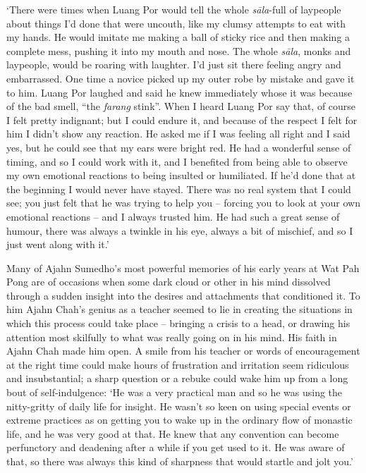 `There were times when Luang Por would tell the whole \emph{sāla}-full
of laypeople about things I'd done that were uncouth, like my clumsy
attempts to eat with my hands. He would imitate me making a ball of
sticky rice and then making a complete mess, pushing it into my mouth
and nose. The whole \emph{sāla}, monks and laypeople, would be roaring
with laughter. I'd just sit there feeling angry and embarrassed. One
time a novice picked up my outer robe by mistake and gave it to him. 
Luang Por laughed and said he knew immediately whose it was because of
the bad smell, ``the \emph{farang} stink''. When I heard Luang Por say
that, of course I felt pretty indignant; but I could endure it, and
because of the respect I felt for him I didn't show any reaction. He
asked me if I was feeling all right and I said yes, but he could see
that my ears were bright red. He had a wonderful sense of timing, and so
I could work with it, and I benefited from being able to observe my own
emotional reactions to being insulted or humiliated. If he'd done that
at the beginning I would never have stayed. There was no real system
that I could see; you just felt that he was trying to help you --
forcing you to look at your own emotional reactions -- and I always
trusted him. He had such a great sense of humour, there was always a
twinkle in his eye, always a bit of mischief, and so I just went along
with it.'

Many of Ajahn Sumedho's most powerful memories of his early years at Wat
Pah Pong are of occasions when some dark cloud or other in his mind
dissolved through a sudden insight into the desires and attachments that
conditioned it. To him Ajahn Chah's genius as a teacher seemed to lie in
creating the situations in which this process could take place --
bringing a crisis to a head, or drawing his attention most skilfully to
what was really going on in his mind. His faith in Ajahn Chah made him
open. A smile from his teacher or words of encouragement at the right
time could make hours of frustration and irritation seem ridiculous and
insubstantial; a sharp question or a rebuke could wake him up from a
long bout of self-indulgence: `He was a very practical man and so he was
using the nitty-gritty of daily life for insight. He wasn't so keen on
using special events or extreme practices as on getting you to wake up
in the ordinary flow of monastic life, and he was very good at that. He
knew that any convention can become perfunctory and deadening after a
while if you get used to it. He was aware of that, so there was always
this kind of sharpness that would startle and jolt you.'

